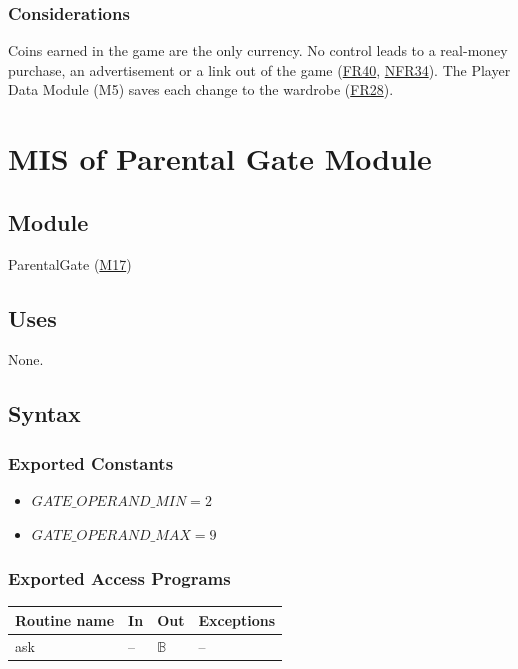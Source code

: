 \documentclass[10pt, titlepage]{article}
\newcommand{\srsurl}{https://team-hindsight.github.io/ophthamology-game/SRS/SRS.pdf}
\newcommand{\srsitemref}[2]{\href{\srsurl\#nameddest=#1}{#2}}
\newcommand{\misref}[2]{\hyperref[mis:#1]{M#2}}
\newcommand{\B}{\mathbb{B}}
\newcommand{\T}[1]{\mathit{#1}}          %
\newenvironment{accessprogs}{%
  \begin{center}\small
  \begin{tabular}{>{\raggedright\arraybackslash}p{3.0cm}
    >{\raggedright\arraybackslash}p{5.0cm}
    >{\raggedright\arraybackslash}p{2.8cm}
    >{\raggedright\arraybackslash}p{3.4cm}}
  \toprule
  \textbf{Routine name} & \textbf{In} & \textbf{Out} & \textbf{Exceptions}\\
  \midrule}{%
  \bottomrule
  \end{tabular}
  \end{center}}
\begin{document}
\subsubsection{Considerations}

Coins earned in the game are the only currency. No control leads to a
real-money purchase, an advertisement or a link out of the game
(\srsitemref{FR_NoRealMoney}{FR40}, \srsitemref{NFR_StoreCompliance}{NFR34}).
The Player Data Module (M5) saves each change to the wardrobe
(\srsitemref{FR_PersistState}{FR28}).

\newpage
\section{MIS of Parental Gate Module} \label{mis:Gate}

\subsection{Module}

ParentalGate (\misref{Gate}{17})

\subsection{Uses}

None.

\subsection{Syntax}

\subsubsection{Exported Constants}

\begin{itemize}
\item $\T{GATE\_OPERAND\_MIN} = 2$
\item $\T{GATE\_OPERAND\_MAX} = 9$
\end{itemize}

\subsubsection{Exported Access Programs}

\begin{accessprogs}
ask & -- & $\B$ & --\\
\end{accessprogs}
\end{document}
